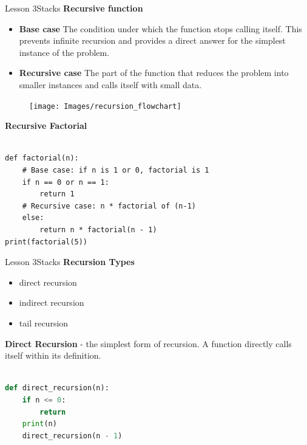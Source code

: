 \documentclass[aspectratio=1610]{beamer}
\begin{document}
\begin{frame}{Lesson 3}{Stacks}
\LARGE
\textbf{Recursive function}\\
\begin{minipage}{0.60\textwidth}
\Large
\begin{itemize}
    \item \textbf{Base case} The condition under which the function stops calling itself. This prevents infinite recursion and provides a direct answer for the simplest instance of the problem.
    \item \textbf{Recursive case} The part of the function that reduces the problem into smaller instances and calls itself with small data.
\end{itemize}
  \end{minipage}
\begin{minipage}{.0\textwidth}
      \begin{figure}
        \texttt{[image: Images/recursion\_flowchart]}
      \end{figure}
  \end{minipage}  
\end{frame}



\begin{frame}[fragile]
\Large
\textbf{Recursive Factorial}\\~\\
\begin{lstlisting}
def factorial(n):
    # Base case: if n is 1 or 0, factorial is 1
    if n == 0 or n == 1:
        return 1
    # Recursive case: n * factorial of (n-1)
    else:
        return n * factorial(n - 1)
print(factorial(5))
 \end{lstlisting}
\end{frame}


\begin{frame}{Lesson 3}{Stacks}
\LARGE
\textbf{Recursion Types}\\
\begin{itemize}
    \item direct recursion
    \item indirect recursion
    \item tail recursion 
\end{itemize}
\end{frame}



\begin{frame}[fragile]
\Large
\textbf{Direct Recursion} - the simplest form of recursion. A function directly calls itself within its definition. \\~\\
\begin{lstlisting}[language=Python]
def direct_recursion(n):
    if n <= 0:
        return
    print(n)
    direct_recursion(n - 1)
 \end{lstlisting}
\end{frame} 
\end{document}
